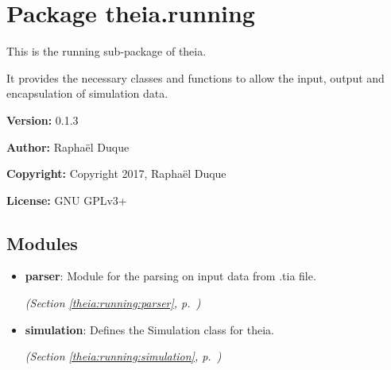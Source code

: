 %
%
%


\section{Package theia.running}

    \label{theia:running}
This is the running sub-package of theia.

It provides the necessary classes and functions to allow the input, output 
and encapsulation of simulation data.

\textbf{Version:} 0.1.3



\textbf{Author:} Raphaël Duque



\textbf{Copyright:} Copyright 2017, Raphaël Duque



\textbf{License:} GNU GPLv3+





\subsection{Modules}

\begin{itemize}
\setlength{\parskip}{0ex}
\item \textbf{parser}: Module for the parsing on input data from .tia file.



  \textit{(Section \ref{theia:running:parser}, p.~\pageref{theia:running:parser})}

\item \textbf{simulation}: Defines the Simulation class for theia.



  \textit{(Section \ref{theia:running:simulation}, p.~\pageref{theia:running:simulation})}

\end{itemize}

